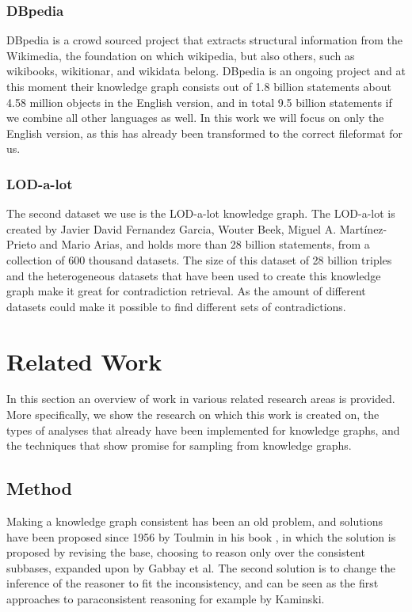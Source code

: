 \documentclass[11pt,letterpaper ,oneside ]{book}
\begin{document}
\subsection{DBpedia}
DBpedia\cite{DBpedia} is a crowd sourced project that extracts structural information from the Wikimedia, the foundation on which wikipedia, but also others, such as wikibooks, wikitionar, and wikidata belong. DBpedia is an ongoing project and at this moment their knowledge graph consists out of 1.8 billion statements about 4.58 million objects in the English version, and in total 9.5 billion statements if we combine all other languages as well. In this work we will focus on only the English version, as this has already been transformed to the correct fileformat for us. 

\subsection{LOD-a-lot}
The second dataset we use is the LOD-a-lot\cite{JavierD:2017} knowledge graph. The LOD-a-lot is created by Javier David Fernandez Garcia, Wouter Beek, Miguel A. Martínez-Prieto and Mario Arias, and holds more than 28 billion statements, from a collection of 600 thousand datasets. The size of this dataset of 28 billion triples and the heterogeneous datasets that have been used to create this knowledge graph make it great for contradiction retrieval. As the amount of different datasets could make it possible to find different sets of contradictions.

\newpage
\chapter{Related Work}\label{RelatedWork}
In this section an overview of work in various related research areas is provided. More specifically, we show the research on which this work is created on, the types of analyses that already have been implemented for knowledge graphs, and the techniques that show promise for sampling from knowledge graphs. \\

\section{Method}
Making a knowledge graph consistent has been an old problem, and solutions have been proposed since 1956 by Toulmin in his book \cite{toulmin:1956}, in which the solution is proposed by revising the base, choosing to reason only over the consistent subbases, expanded upon by Gabbay et al\cite{Gabbay:1994}. The second solution is to change the inference of the reasoner to fit the inconsistency, and can be seen as the first approaches to paraconsistent reasoning for example by Kaminski\cite{Kaminski:2015}.
\end{document}

